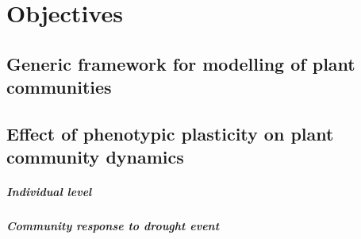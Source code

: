 
\chapter{Objectives}

\section{Generic framework for modelling of plant communities}
\section{Effect of phenotypic plasticity on plant community dynamics}
\paragraph{Individual level}
\paragraph{Community response to drought event}
